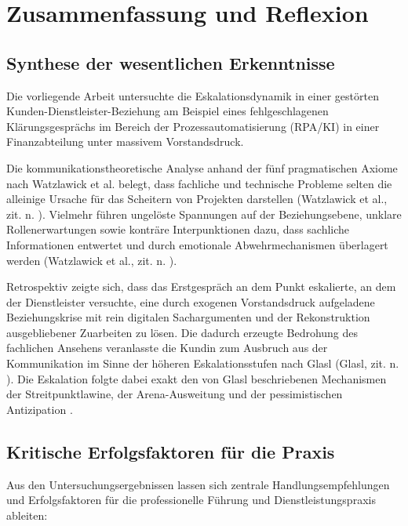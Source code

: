 
\chapter{Zusammenfassung und Reflexion} 
\label{sec:reflexion}

\section{Synthese der wesentlichen Erkenntnisse}
Die vorliegende Arbeit untersuchte die Eskalationsdynamik in einer gestörten Kunden-Dienstleister-Beziehung am Beispiel eines fehlgeschlagenen Klärungsgesprächs im Bereich der Prozessautomatisierung (\acs{RPA}/\acs{KI}) in einer Finanzabteilung unter massivem Vorstandsdruck.

Die kommunikationstheoretische Analyse anhand der fünf pragmatischen Axiome nach Watzlawick et al. belegt, dass fachliche und technische Probleme selten die alleinige Ursache für das Scheitern von Projekten darstellen (Watzlawick et al., zit. n. \cite[S.~11--16]{3}). Vielmehr führen ungelöste Spannungen auf der Beziehungsebene, unklare Rollenerwartungen sowie konträre Interpunktionen dazu, dass sachliche Informationen entwertet und durch emotionale Abwehrmechanismen überlagert werden (Watzlawick et al., zit. n. \cite[S.~12--14]{3}).

Retrospektiv zeigte sich, dass das Erstgespräch an dem Punkt eskalierte, an dem der Dienstleister versuchte, eine durch exogenen Vorstandsdruck aufgeladene Beziehungskrise mit rein digitalen Sachargumenten und der Rekonstruktion ausgebliebener Zuarbeiten zu lösen. Die dadurch erzeugte Bedrohung des fachlichen Ansehens veranlasste die Kundin zum Ausbruch aus der Kommunikation im Sinne der höheren Eskalationsstufen nach Glasl (Glasl, zit. n. \cite[S.~37--40]{5}). Die Eskalation folgte dabei exakt den von Glasl beschriebenen Mechanismen der Streitpunktlawine, der Arena-Ausweitung und der pessimistischen Antizipation \cite[S.~30--33]{5}.

\section{Kritische Erfolgsfaktoren für die Praxis}
Aus den Untersuchungsergebnissen lassen sich zentrale Handlungsempfehlungen und Erfolgsfaktoren für die professionelle Führung und Dienstleistungspraxis ableiten:

